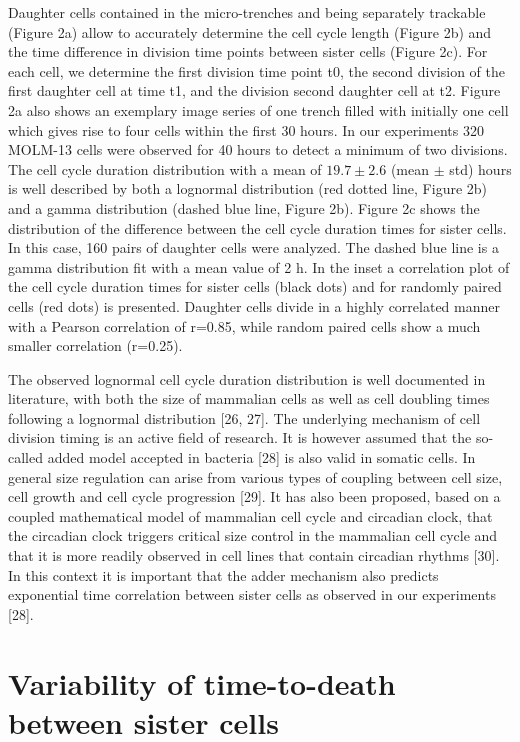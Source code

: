 \documentclass[pdftex,12pt,a4paper]{report}
\begin{document}
Daughter cells contained in the micro-trenches and being separately trackable (Figure 2a) allow to accurately determine the cell cycle length (Figure 2b) and the time difference in division time points between sister cells (Figure 2c). For each cell, we determine the first division time point t0, the second division of the first daughter cell at time t1, and the division second daughter cell at t2. Figure 2a also shows an exemplary image series of one trench filled with initially one cell which gives rise to four cells within the first 30 hours. In our experiments 320 MOLM-13 cells were observed for 40 hours to detect a minimum of two divisions. The cell cycle duration distribution with a mean of $19.7 \pm 2.6$ (mean $\pm$ std) hours is well described by both a lognormal distribution (red dotted line, Figure 2b) and a gamma distribution (dashed blue line, Figure 2b). Figure 2c shows the distribution of the difference between the cell cycle duration times for sister cells. In this case, 160 pairs of daughter cells were analyzed. The dashed blue line is a gamma distribution fit with a mean value of 2 h. In the inset a correlation plot of the cell cycle duration times for sister cells (black dots) and for randomly paired cells (red dots) is presented. Daughter cells divide in a highly correlated manner with a Pearson correlation of r=0.85, while random paired cells show a much smaller correlation (r=0.25).

The observed lognormal cell cycle duration distribution is well documented in literature, with both the size of mammalian cells as well as cell doubling times following a lognormal distribution [26, 27]. The underlying mechanism of cell division timing is an active field of research. It is however assumed that the so-called added model accepted in bacteria [28] is also valid in somatic cells. In general size regulation can arise from various types of coupling between cell size, cell growth and cell cycle progression [29]. It has also been proposed, based on a coupled mathematical model of mammalian cell cycle and circadian clock, that the circadian clock triggers critical size control in the mammalian cell cycle and that it is more readily observed in cell lines that contain circadian rhythms [30]. In this context it is important that the adder mechanism also predicts exponential time correlation between sister cells as observed in our experiments [28]. 


\section{Variability of time-to-death between sister cells}
\end{document}
